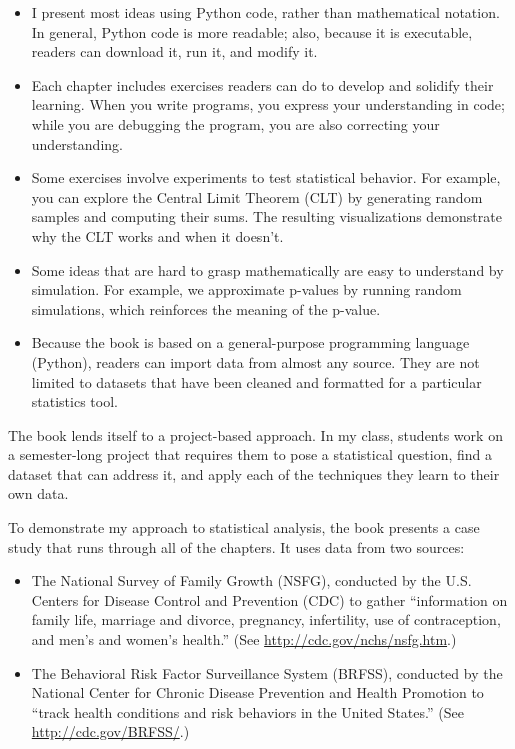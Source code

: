 \documentclass[12pt]{book}
\theoremstyle{exercise}
\begin{document}
\begin{itemize}

\item I present most ideas using Python code, rather than
  mathematical notation.  In general, Python code is more readable;
  also, because it is executable, readers can download it, run it,
  and modify it.

\item Each chapter includes exercises readers can do to develop
  and solidify their learning.  When you write programs, you
  express your understanding in code; while you are debugging the
  program, you are also correcting your understanding.%

\item Some exercises involve experiments to test statistical
  behavior.  For example, you can explore the Central Limit Theorem
  (CLT) by generating random samples and computing their sums.  The
  resulting visualizations demonstrate why the CLT works and when
  it doesn't.%
%

\item Some ideas that are hard to grasp mathematically are easy to
  understand by simulation.  For example, we approximate p-values by
  running random simulations, which reinforces the meaning of the
  p-value.%

\item Because the book is based on a general-purpose programming
  language (Python), readers can import data from almost any source.
  They are not limited to datasets that have been cleaned and
  formatted for a particular statistics tool.

\end{itemize}

The book lends itself to a project-based approach.  In my class,
students work on a semester-long project that requires them to pose a
statistical question, find a dataset that can address it, and apply
each of the techniques they learn to their own data.

To demonstrate my approach to statistical analysis, the book
presents a case study that runs through all of the chapters.  It uses
data from two sources:

\begin{itemize}

\item The National Survey of Family Growth (NSFG), conducted by the
  U.S. Centers for Disease Control and Prevention (CDC) to gather
  ``information on family life, marriage and divorce, pregnancy,
  infertility, use of contraception, and men's and women's health.''
  (See \url{http://cdc.gov/nchs/nsfg.htm}.)

\item The Behavioral Risk Factor Surveillance System (BRFSS),
  conducted by the National Center for Chronic Disease Prevention and
  Health Promotion to ``track health conditions and risk behaviors in
  the United States.''  (See \url{http://cdc.gov/BRFSS/}.)

\end{itemize}
\end{document}
